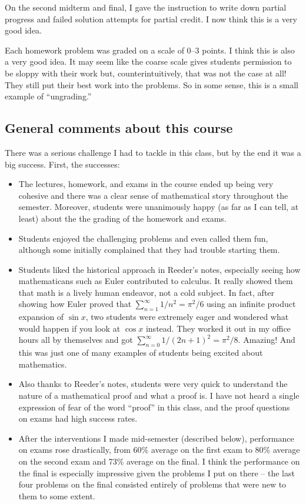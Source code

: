 \documentclass[11pt,oneside]{amsart}
\begin{document}
On the second midterm and final, I gave the instruction to write down partial progress and failed solution attempts for partial credit. I now think this is a very good idea.

Each homework problem was graded on a scale of 0--3 points. I think this is also a very good idea. It may seem like the coarse scale gives students permission to be sloppy with their work but, counterintuitively, that was not the case at all! They still put their best work into the problems. So in some sense, this is a small example of ``ungrading.''

\subsection{General comments about this course}
There was a serious challenge I had to tackle in this class, but by the end it was a big success. First, the successes:
\begin{itemize}
  \item The lectures, homework, and exams in the course ended up being very cohesive and there was a clear sense of mathematical story throughout the semester. Moreover, students were unanimously happy (as far as I can tell, at least) about the the grading of the homework and exams.
  \item Students enjoyed the challenging problems and even called them fun, although some initially complained that they had trouble starting them.
  \item Students liked the historical approach in Reeder's notes, especially seeing how mathematicans such as Euler contributed to calculus. It really showed them that math is a lively human endeavor, not a cold subject. In fact, after showing how Euler proved that $\sum_{n=1}^\infty 1/n^2=\pi^2/6$ using an infinite product expansion of $\sin x$, two students were extremely eager and wondered what would happen if you look at $\cos x$ instead. They worked it out in my office hours all by themselves and got $\sum_{n=0}^\infty 1/(2n+1)^2=\pi^2/8$. Amazing! And this was just one of many examples of students being excited about mathematics.
  \item Also thanks to Reeder's notes, students were very quick to understand the nature of a mathematical proof and what a proof is. I have not heard a single expression of fear of the word ``proof'' in this class, and the proof questions on exams had high success rates.
  \item After the interventions I made mid-semester (described below), performance on exams rose drastically, from 60\% average on the first exam to 80\% average on the second exam and 73\% average on the final. I think the performance on the final is especially impressive given the problems I put on there -- the last four problems on the final consisted entirely of problems that were new to them to some extent.
\end{itemize}
\end{document}
